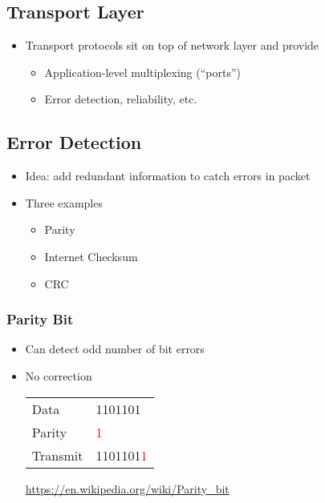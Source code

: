 \subsection{Transport Layer}
\begin{itemize}
    \item Transport protocols sit on top of network layer and provide
          \begin{itemize}[nosep]
              \item Application-level multiplexing (``ports'')
              \item Error detection, reliability, etc.
          \end{itemize}
\end{itemize}
\subsection{Error Detection}
\begin{itemize}[nosep]
    \item Idea: add redundant information to catch errors in packet
    \item Three examples
          \begin{itemize}[nosep]
              \item Parity
              \item Internet Checksum
              \item CRC
          \end{itemize}
\end{itemize}
\subsubsection{Parity Bit}
\begin{itemize}[nosep]
    \item Can detect odd number of bit errors
    \item No correction

          \begin{table}[H]
              \begin{tabular}{ll}
                  Data     & 1101101                   \\
                  Parity   & \textcolor{red}{1}        \\
                  Transmit & 1101101\textcolor{red}{1}
              \end{tabular}
          \end{table}
          \url{https://en.wikipedia.org/wiki/Parity_bit}
\end{itemize}

